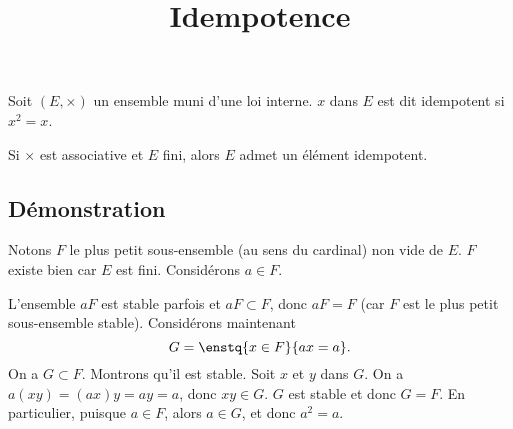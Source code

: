 \documentclass[fontsize=12pt,twoside=false,parskip=half, french]{scrartcl}
\title{Idempotence}
\date{}
\author{}
\begin{document}
\maketitle
   Soit $(E, \times)$ un ensemble muni d’une loi interne. $x$ dans $E$ est dit idempotent 
   si $x^2 = x$.
   \begin{Theoreme}
      Si $\times$ est associative et $E$ fini, alors $E$ admet un élément idempotent.
   \end{Theoreme}
   \subsection{Démonstration}
      Notons $F$ le plus petit sous-ensemble (au sens du cardinal) non vide de $E$. $F$ existe bien 
      car $E$ est fini. Considérons $a \in F$.
      
      L’ensemble $aF$ est stable parfois et $aF \subset F$, donc $aF = F$ (car $F$ est le plus petit
      sous-ensemble stable). Considérons maintenant
      \[
         G = \enstq{x \in F}{ax = a}.
      \]
      On a $G \subset F$. Montrons qu’il est stable. Soit $x$ et $y$ dans $G$. On a $a(xy) = (ax)y = ay = a$,
      donc $xy \in G$. $G$ est stable et donc $G = F$. En particulier, puisque $a \in F$, alors $a \in G$,
      et donc $a^2 = a$.
\end{document}
